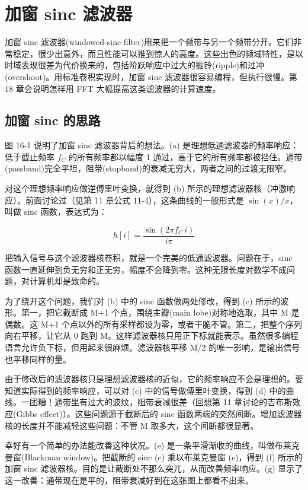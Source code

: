 
\chapter{加窗 sinc 滤波器}\label{ch-16}

加窗 sinc 滤波器(windowed-sinc
filter)用来把一个频带与另一个频带分开。它们非常稳定，很少出意外，而且性能可以推到惊人的高度。这些出色的频域特性，是以时域表现很差为代价换来的，包括阶跃响应中过大的振铃(ripple)和过冲(overshoot)。用标准卷积实现时，加窗
sinc 滤波器很容易编程，但执行很慢。第 18 章会说明怎样用 FFT
大幅提高这类滤波器的计算速度。

\section{加窗 sinc 的思路}

图 16-1 说明了加窗 sinc 滤波器背后的想法。(a)
是理想低通滤波器的频率响应：低于截止频率 \(f_C\) 的所有频率都以幅度 1
通过，高于它的所有频率都被挡住。通带(passband)完全平坦，阻带(stopband)的衰减无穷大，两者之间的过渡无限窄。

对这个理想频率响应做逆傅里叶变换，就得到 (b)
所示的理想滤波器核（冲激响应）。前面讨论过（见第 11 章公式
11-4），这条曲线的一般形式是 \(\sin(x)/x\)，叫做 sinc 函数，表达式为：

\[h[i] = \frac{\sin(2\pi f_C\, i)}{i\pi}\]

把输入信号与这个滤波器核卷积，就是一个完美的低通滤波器。问题在于，sinc
函数一直延伸到负无穷和正无穷，幅度不会降到零。这种无限长度对数学不成问题，对计算机却是致命的。

为了绕开这个问题，我们对 (b) 中的 sinc 函数做两处修改，得到 (c)
所示的波形。第一，把它截断成 M+1 个点，围绕主瓣(main
lobe)对称地选取，其中 M 是偶数。这 M+1
个点以外的所有采样都设为零，或者干脆不管。第二，把整个序列向右平移，让它从
0 跑到
M。这样滤波器核只用正下标就能表示。虽然很多编程语言允许负下标，但用起来很麻烦。滤波器核平移
M/2 的唯一影响，是输出信号也平移同样的量。

由于修改后的滤波器核只是理想滤波器核的近似，它的频率响应不会是理想的。要知道实际得到的频率响应，可以对
(c) 中的信号做傅里叶变换，得到 (d)
中的曲线。一团糟！通带里有过大的波纹，阻带衰减很差（回想第 11
章讨论的吉布斯效应(Gibbs effect)）。这些问题源于截断后的 sinc
函数两端的突然间断。增加滤波器核的长度并不能减轻这些问题：不管 M
取多大，这个间断都很显著。

幸好有一个简单的办法能改善这种状况。(e)
是一条平滑渐收的曲线，叫做布莱克曼窗(Blackman window)。把截断的 sinc (c)
乘以布莱克曼窗 (e)，得到 (f) 所示的加窗 sinc
滤波器核。目的是让截断处不那么突兀，从而改善频率响应。(g)
显示了这一改善：通带现在是平的，阻带衰减好到在这张图上都看不出来。

